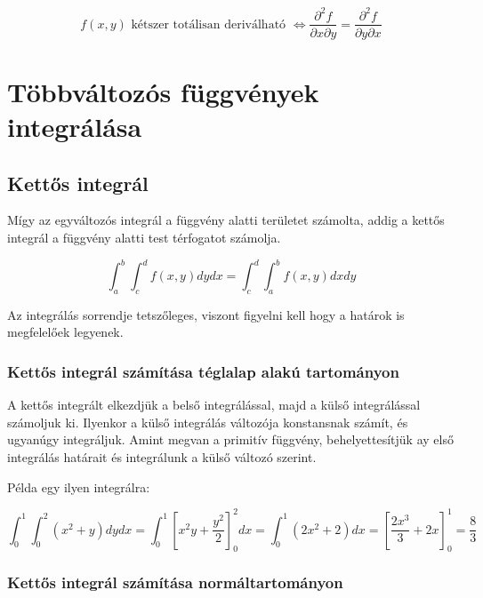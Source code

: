 \documentclass{article}
\begin{document}
\begin{equation*}
    f(x,y) \text{ kétszer totálisan deriválható } \Leftrightarrow \frac{\partial^2 f}{\partial x \partial y} = \frac{\partial^2 f}{\partial y \partial x}
\end{equation*}


\newpage

\section{Többváltozós függvények integrálása}

\subsection{Kettős integrál}

Mígy az egyváltozós integrál a függvény alatti területet számolta, addig a kettős integrál a függvény alatti test térfogatot számolja.

\begin{equation*}
    \int_{a}^{b} \int_{c}^{d} f(x,y) dy dx = \int_{c}^{d} \int_{a}^{b} f(x,y) dx dy
\end{equation*}

Az integrálás sorrendje tetszőleges, viszont figyelni kell hogy a határok is megfelelőek legyenek.

\subsubsection{Kettős integrál számítása téglalap alakú tartományon}

A kettős integrált elkezdjük a belső integrálással, majd a kül\-ső in\-teg\-rá\-lás\-sal számoljuk ki.
Ilyenkor a külső integrálás változója konstansnak számít, és ugyanúgy integráljuk. Amint megvan a primitív függvény, behelyettesítjük ay első integrálás határait
és integrálunk a külső változó szerint.

Példa egy ilyen integrálra:

\begin{equation*}
    \int_{0}^{1} \int_{0}^{2} (x^2 + y) dy dx = \int_{0}^{1} \left[ x^2y + \frac{y^2}{2} \right]_{0}^{2} dx = \int_{0}^{1} (2x^2 + 2) dx = \left[ \frac{2x^3}{3} + 2x \right]_{0}^{1} = \frac{8}{3}
\end{equation*}

\subsubsection{Kettős integrál számítása normáltartományon}
\end{document}
